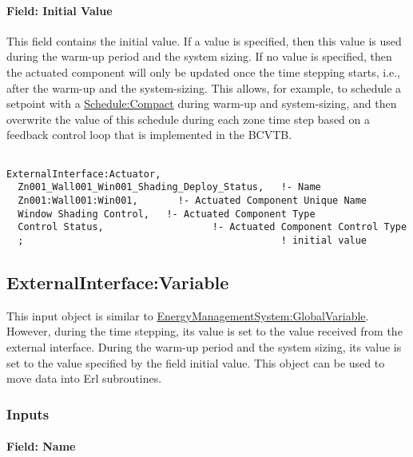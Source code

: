 \paragraph{Field: Initial Value}\label{field-initial-value-1}

This field contains the initial value. If a value is specified, then this value is used during the warm-up period and the system sizing. If no value is specified, then the actuated component will only be updated once the time stepping starts, i.e., after the warm-up and the system-sizing. This allows, for example, to schedule a setpoint with a \hyperref[schedulecompact]{Schedule:Compact} during warm-up and system-sizing, and then overwrite the value of this schedule during each zone time step based on a feedback control loop that is implemented in the BCVTB.

\begin{lstlisting}

ExternalInterface:Actuator,
  Zn001_Wall001_Win001_Shading_Deploy_Status,   !- Name
  Zn001:Wall001:Win001,       !- Actuated Component Unique Name
  Window Shading Control,   !- Actuated Component Type
  Control Status,                   !- Actuated Component Control Type
  ;                                             ! initial value
\end{lstlisting}

\subsection{ExternalInterface:Variable}\label{externalinterfacevariable}

This input object is similar to \hyperref[energymanagementsystemglobalvariable]{EnergyManagementSystem:GlobalVariable}. However, during the time stepping, its value is set to the value received from the external interface. During the warm-up period and the system sizing, its value is set to the value specified by the field initial value. This object can be used to move data into Erl subroutines.

\subsubsection{Inputs}\label{inputs-3-013}

\paragraph{Field: Name}\label{field-name-3-012}

